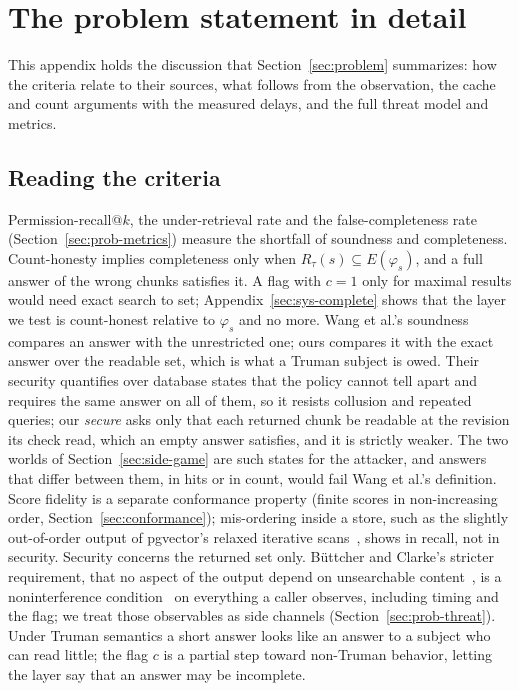 
\section{The problem statement in detail}\label{app:problem}

This appendix holds the discussion that Section~\ref{sec:problem} summarizes: how the criteria relate to their
sources, what follows from the observation, the cache and count arguments with the measured delays, and the full
threat model and metrics.

\subsection{Reading the criteria}\label{app:criteria}

Permission-recall@$k$, the under-retrieval rate and the false-completeness rate
(Section~\ref{sec:prob-metrics}) measure the shortfall of soundness and completeness. Count-honesty
implies completeness only when $R_\tau(s) \subseteq E(\varphi_s)$,
and a full answer of the wrong chunks satisfies it. A flag with
$c = 1$ only for maximal results would need exact search to set; Appendix~\ref{sec:sys-complete} shows
that the layer we test is count-honest relative to $\varphi_s$ and no more. Wang et al.'s soundness
compares an answer with the unrestricted one; ours compares it with the exact answer over the
readable set, which is what a Truman subject is owed. Their security quantifies over database states
that the policy cannot tell apart and requires the same answer on all of them, so it resists collusion and repeated queries; our \emph{secure} asks only that each returned chunk be readable at the revision its check read, which an
empty answer satisfies, and it is strictly weaker. The two worlds of Section~\ref{sec:side-game} are such states for the attacker, and answers that differ between them, in hits or in count, would fail
Wang et al.'s definition. Score fidelity is a separate conformance
property (finite scores in non-increasing order, Section~\ref{sec:conformance}); mis-ordering inside
a store, such as the slightly out-of-order output of pgvector's relaxed iterative
scans~\cite{pgvector2026pgvector}, shows in recall, not in security. Security concerns the returned
set only. B\"{u}ttcher and Clarke's stricter requirement,
that no aspect of the output depend on unsearchable content~\cite{buttcher2005security}, is a
noninterference condition~\cite{goguen1982security} on everything a caller observes, including timing
and the flag; we treat those observables as side channels (Section~\ref{sec:prob-threat}). Under
Truman semantics a short answer looks like an answer to a subject who can read little; the flag $c$
is a partial step toward non-Truman behavior, letting the layer say that an answer may be
incomplete.


